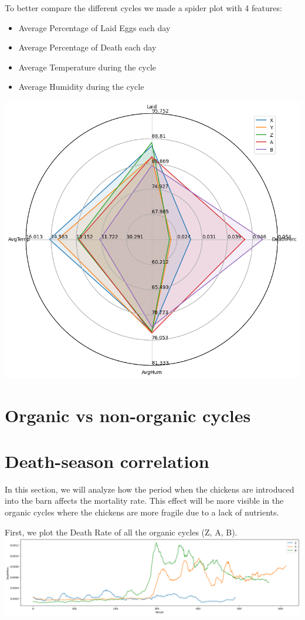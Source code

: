 \documentclass[11pt]{article}
\begin{document}
To better compare the different cycles we made a spider plot with 4 features:
\begin{itemize}
    \item Average Percentage of Laid Eggs each day
    \item Average Percentage of Death each day
    \item Average Temperature during the cycle
    \item Average Humidity during the cycle
\end{itemize}
\includegraphics[width=\linewidth]{../Results/Every_cycle/Spider_Plot.png}
\section{Organic vs non-organic cycles}

\section{Death-season correlation}
In this section, we will analyze how the period when the chickens are introduced into the barn affects the mortality rate. This effect will be more visible in the organic cycles where the chickens are more fragile due to a lack of nutrients.

First, we plot the Death Rate of all the organic cycles (Z, A, B).\newline
\includegraphics[width=\linewidth]{../Results/Comparison_Z_AB/Death.png}
\end{document}
